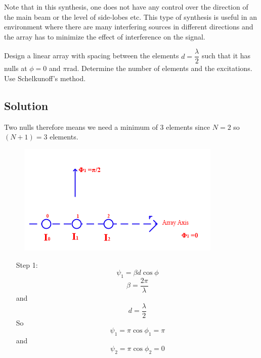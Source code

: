Note that in this synthesis, one does not have any control over the direction of the main beam or the level of side-lobes etc. This type of synthesis is useful in an environment where there are many interfering sources in different directions and the array has to minimize the effect of interference on the signal.

\begin{exmp}
 Design a linear array with spacing between the elements  $d=\dfrac{\lambda}{2}$ such that it has nulls at $\phi=0$ and $\pi$rad. Determine the number of elements and the excitations. Use Schelkunoff's method.
\subsection*{\centering Solution}
Two nulls therefore means we need a minimum of 3 elements since $N=2$ so $(N+1)=3$ elements.
\begin{figure}[h]
 \centering
\includegraphics[width=1\linewidth]{"./graphics/image58_3"}
\caption{}
\label{fig:fig}
\end{figure}
\begin{enumerate}
\item[Step 1:] $$\psi_{1}=\beta d\cos\phi$$
 $$\beta=\dfrac{2\pi}{\lambda}$$ and $$d=\dfrac{\lambda}{2}$$
So $$\psi_{1}=\pi\cos\phi_{1}=\pi$$
and $$\psi_{2}=\pi\cos\phi_{2}=0$$
\begin{figure}[h]
\centering

\end{figure}
\end{enumerate}
\end{exmp}
